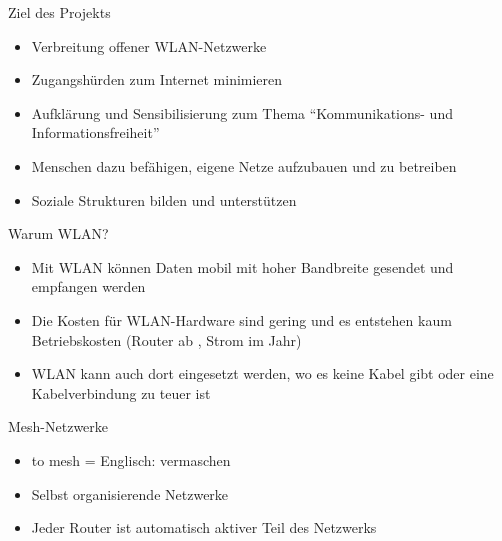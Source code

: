 \documentclass[c]{beamer}
\begin{document}
\begin{frame}{Ziel des Projekts}
	\begin{itemize}
		\item Verbreitung offener WLAN-Netzwerke
		\item Zugangshürden zum Internet minimieren
		\item Aufklärung und Sensibilisierung zum Thema ``Kommunikations- und Informationsfreiheit''
		\item Menschen dazu befähigen, eigene Netze aufzubauen und zu betreiben
		\item Soziale Strukturen bilden und unterstützen
	\end{itemize}
\end{frame}

\begin{frame}{Warum WLAN?}
	\begin{itemize}
		\item Mit WLAN können Daten mobil mit hoher Bandbreite gesendet und empfangen werden
		\item Die Kosten für WLAN-Hardware sind gering und es entstehen kaum Betriebskosten (Router ab , Strom  im Jahr)
		\item WLAN kann auch dort eingesetzt werden, wo es keine Kabel gibt oder eine Kabelverbindung zu teuer ist
	\end{itemize}
\end{frame}


\begin{frame}{Mesh-Netzwerke}
	\begin{itemize}
		\item to mesh = Englisch: vermaschen
		\item Selbst organisierende Netzwerke
		\item Jeder Router ist automatisch aktiver Teil des Netzwerks
	\end{itemize}
\end{frame}
\end{document}
